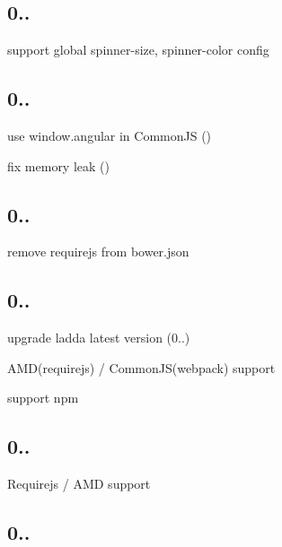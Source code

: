 \subsection*{0..}


\begin{DoxyItemize}
\item support global spinner-\/size, spinner-\/color config
\end{DoxyItemize}

\subsection*{0..}


\begin{DoxyItemize}
\item use window.\+angular in Common\+JS ()
\item fix memory leak ()
\end{DoxyItemize}

\subsection*{0..}


\begin{DoxyItemize}
\item remove requirejs from bower.\+json
\end{DoxyItemize}

\subsection*{0..}


\begin{DoxyItemize}
\item upgrade ladda latest version (0..)
\item A\+M\+D(requirejs) / Common\+J\+S(webpack) support
\item support npm
\end{DoxyItemize}

\subsection*{0..}


\begin{DoxyItemize}
\item Requirejs / A\+MD support
\end{DoxyItemize}

\subsection*{0..}


